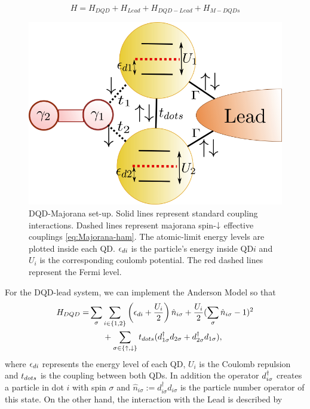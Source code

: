 \documentclass[showpacs,aps,prb,reprint,superscriptaddress]{revtex4-1}
\begin{document}
\begin{equation}
H=H_{DQD}+H_{Lead}+H_{DQD-Lead}+H_{M-DQDs} 
\label{eq:Ham}
\end{equation}


\begin{figure}[bt]
\begin{center}
\includegraphics[scale=0.4]{Graficos/Model.png}
\caption{ DQD-Majorana set-up. Solid lines represent standard coupling interactions. Dashed lines represent majorana spin-$\downarrow$ effective couplings \eqref{eq:Majorana-ham}. The atomic-limit energy levels are plotted inside each QD. $\epsilon_{di}$ is the particle's energy inside QD$i$ and $U_i$ is the corresponding coulomb potential. The red dashed lines represent the Fermi level.  
}
%
\label{fig:GenModel}
\end{center}
\end{figure}


For the DQD-lead system, we can implement the Anderson Model so that 
\begin{align*}
H_{DQD}=& \sum_{\sigma} \sum_{i\in\{1,2\}}\left(\epsilon_{di}+\frac{U_i}{2}\right)\hat{n}_{i\sigma}+ \frac{U_i}{2}(\sum_{\sigma} \hat{n}_{i\sigma}-1)^{2} \\
&\ \ \ \ \ + \sum_{\sigma \in \{\uparrow , \downarrow\}} t_{dots}(d^{\dagger}_{1\sigma}  d_{2\sigma}+d^{\dagger}_{2\sigma}  d_{1\sigma}),
\end{align*}
%
where $\epsilon_{di}$ represents the energy level of each QD, $U_i$ is the Coulomb repulsion and $t_{dots}$ is the coupling between both QDs. In addition the operator $d^{\dagger}_{i\sigma}$ creates a particle in dot $i$ with spin $\sigma$ and $\hat{n}_{i\sigma}:=d_{i\sigma}^{\dagger}d_{i\sigma}$ is the particle number operator of this state. On the other hand, the interaction with the Lead is described by 
\end{document}
